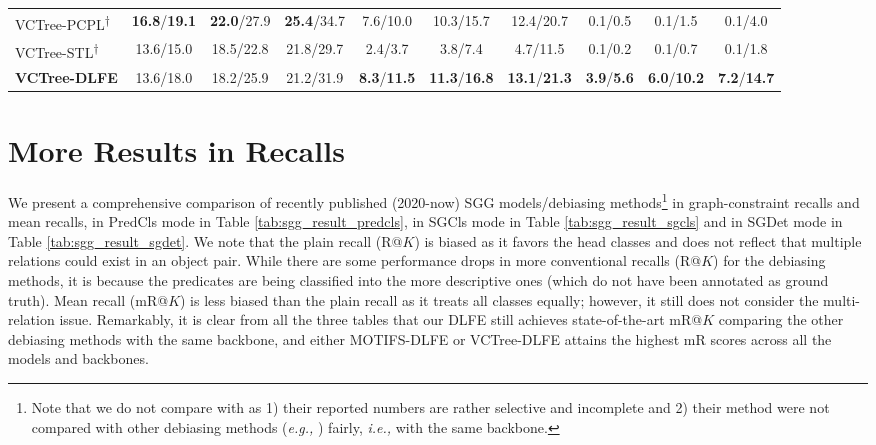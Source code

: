 \documentclass[sigconf]{acmart}
\begin{document}
\begin{table*}[htbp]
{\begin{tabular}{l|c c c|c c c|c c c}
VCTree-PCPL\textsuperscript{$\dagger$} \cite{yan2020pcpl} & \textbf{16.8}/\textbf{19.1} & \textbf{22.0}/27.9 & \textbf{25.4}/34.7 & 7.6/10.0 & 10.3/15.7 & 12.4/20.7 & 0.1/0.5 & 0.1/1.5 & 0.1/4.0 \\
VCTree-STL\textsuperscript{$\dagger$} \cite{chen2019soft} & 13.6/15.0 & 18.5/22.8 & 21.8/29.7 & 2.4/3.7 & 3.8/7.4 & 4.7/11.5 & 0.1/0.2 & 0.1/0.7 & 0.1/1.8 \\
\textbf{VCTree-DLFE} & 13.6/18.0 & 18.2/25.9 & 21.2/31.9 & \textbf{8.3}/\textbf{11.5} & \textbf{11.3}/\textbf{16.8} & \textbf{13.1}/\textbf{21.3} & \textbf{3.9}/\textbf{5.6} & \textbf{6.0}/\textbf{10.2} & \textbf{7.2}/\textbf{14.7} \\
\hline
\end{tabular}
}
\vspace{0.1em}
\caption{Head, middle and tail (with/without graph constraint) recalls in the SGDet task on VG150. $\dagger$ and $\ddagger$ are with the same meaning as in Table 1 of the main paper.
}
\label{tab:head_mid_tail_sgdet}
\end{table*}

\section{More Results in Recalls}
\label{sec:appendix_more_results_in_recalls}
We present a comprehensive comparison of recently published (2020-now) SGG models/debiasing methods\footnote{Note that we do not compare with \cite{knyazev2020graphdensity} as 1) their reported numbers are rather selective and incomplete and 2) their method were not compared with other debiasing methods (\emph{e.g.,} \cite{tang2020unbiased}) fairly, \emph{i.e.,} with the same backbone.} in graph-constraint recalls and mean recalls, in PredCls mode in Table \ref{tab:sgg_result_predcls}, in SGCls mode in Table \ref{tab:sgg_result_sgcls} and in SGDet mode in Table \ref{tab:sgg_result_sgdet}.
We note that the plain recall (R@$K$) is biased as it favors the head classes and does not reflect that multiple relations could exist in an object pair. 
While there are some performance drops in more conventional recalls (R@$K$) for the debiasing methods, it is because the predicates are being classified into the more descriptive ones (which do not have been annotated as ground truth).
Mean recall (mR@$K$) is less biased than the plain recall as it treats all classes equally; however, it still does not consider the multi-relation issue.
Remarkably, it is clear from all the three tables that our DLFE still achieves state-of-the-art mR@$K$ comparing the other debiasing methods with the same backbone, and either MOTIFS-DLFE or VCTree-DLFE attains the highest mR scores across all the models and backbones.
\end{document}
